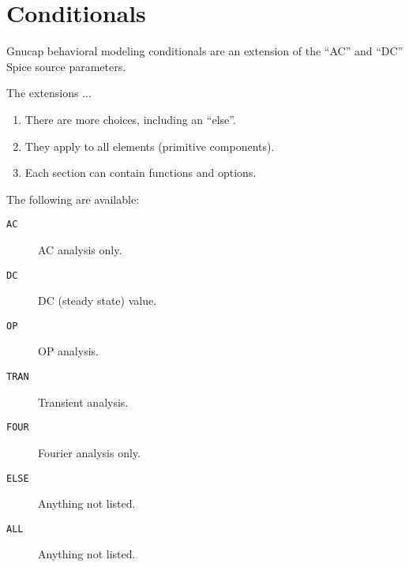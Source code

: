 %
%
%
%
\section{Conditionals}
Gnucap behavioral modeling conditionals are an extension of the ``AC''
and ``DC'' Spice source parameters.  

The extensions ...
\begin{enumerate}

\item There are more choices, including an ``else''.

\item They apply to all elements (primitive components).

\item Each section can contain functions and options.

\end{enumerate}

The following are available:

\begin{description}

\item[{\tt AC}] AC analysis only.
\item[{\tt DC}] DC (steady state) value.
\item[{\tt OP}] OP analysis.
\item[{\tt TRAN}] Transient analysis.
\item[{\tt FOUR}] Fourier analysis only.
\item[{\tt ELSE}] Anything not listed.
\item[{\tt ALL}] Anything not listed.

\end{description}

